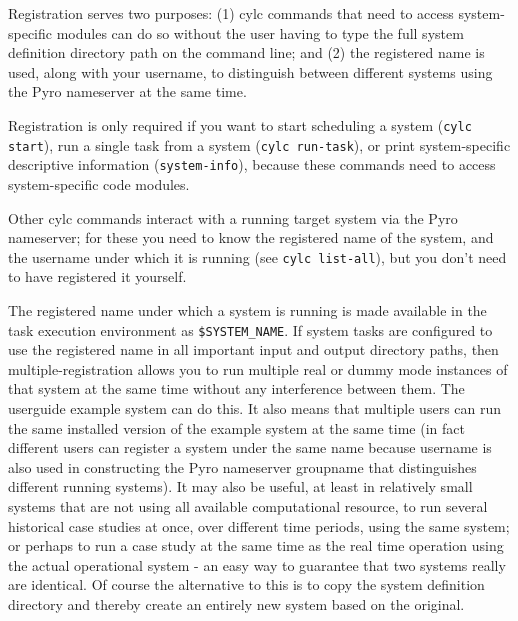 Registration serves two purposes: (1) cylc commands that need to access
system-specific modules can do so without the user having to type the
full system definition directory path on the command line; and (2) the
registered name is used, along with your username, to distinguish
between different systems using the Pyro nameserver at the same time. 

Registration is only required if you want to start scheduling a system
(\lstinline=cylc start=), run a single task from a system 
(\lstinline=cylc run-task=), or print system-specific descriptive
information (\lstinline=system-info=), because these commands need to
access system-specific code modules.

Other cylc commands interact with a running target system via the Pyro
nameserver; for these you need to know the registered name of the
system, and the username under which it is running (see 
\lstinline=cylc list-all=), but you don't need to have registered it
yourself. 

The registered name under which a system is running is made available in
the task execution environment as \lstinline=$SYSTEM_NAME=.  If system
tasks are configured to use the registered name in all important input
and output directory paths, then multiple-registration allows you to run
multiple real or dummy mode instances of that system at the same time
without any interference between them. The userguide example system can
do this. It also means that multiple users can run the same installed
version of the example system at the same time (in fact different users
can register a system under the same name because username is also used
in constructing the Pyro nameserver groupname that distinguishes
different running systems). It may also be useful, at least in
relatively small systems that are not using all available computational
resource, to run several historical case studies at once, over different
time periods, using the same system; or perhaps to run a case study at
the same time as the real time operation using the actual operational
system - an easy way to guarantee that two systems really are identical.
Of course the alternative to this is to copy the system definition
directory and thereby create an entirely new system based on the
original.

